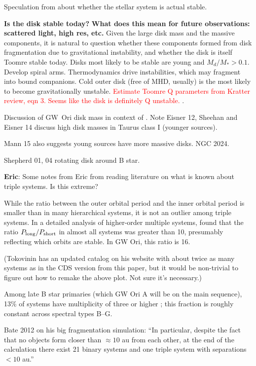 \documentclass[twocolumn]{aastex6}
\newcommand{\todo}[1]{ \textcolor{red}{#1}}
\begin{document}
Speculation from \citet{berger11} about whether the stellar system is actual stable.


\textbf{Is the disk stable today?}
\textbf{What does this mean for future observations: scattered light, high res, etc.}
Given the large disk mass and the massive components, it is natural to question whether these components formed from disk fragmentation due to gravitational instability, and whether the disk is itself Toomre stable today. Disks most likely to be stable are young and $M_d/M_\ast > 0.1$. Develop spiral arms. Thermodynamics drive instabilities, which may fragment into bound companions. Cold outer disk (free of MHD, usually) is the most likely to become gravitationally unstable. \todo{Estimate Toomre Q parameters from Kratter review, eqn 3. Seems like the disk is definitely Q unstable.} \citet{kratter16}.

Discussion of GW~Ori disk mass in context of \citet{andrews13}. Note Eisner 12, Sheehan and Eisner 14 discuss high disk masses in Taurus class I (younger sources).

Mann 15 also suggests young sources have more massive disks. NGC 2024.

Shepherd 01, 04 rotating disk around B star.



\textbf{Eric}: Some notes from Eric from reading literature on what is known about triple systems.  Is this extreme?

While the ratio between the outer orbital period and the inner orbital period is smaller than in many hierarchical systems, it is not an outlier among triple systems.  In a detailed analysis of higher-order multiple systems, \citet{tokovinin97} found that the ratio $P_\mathrm{long} / P_{\rm short}$ in almost all systems was greater than 10, presumably reflecting which orbits are stable.  In GW Ori, this ratio is 16.

(Tokovinin has an updated catalog on his website with about twice as many systems as in the CDS version from this paper, but it would be non-trivial to figure out how to remake the above plot.  Not sure it's necessary.)

Among late B star primaries (which GW Ori A will be on the main sequence), 13\% of systems have multiplicity of three or higher \citep{eggleton08}; this fraction is roughly constant across spectral types B--G.


Bate 2012 on his big fragmentation simulation: ``In particular, despite the fact that no objects form closer than $\approx 10$ au from each other, at the end of the calculation there exist 21 binary systems and one triple system with separations $<10$ au.''
\end{document}
